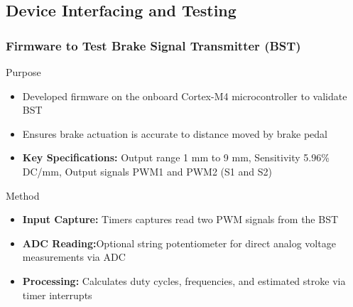 \documentclass[8pt,compress,aspectratio=169]{beamer}
\newcommand\LightBold[1]{\textcolor{VSBlueLight}{\textbf{#1}}}
\begin{document}
\subsection{Device Interfacing and Testing}
\begin{frame}
  \frametitle{Firmware to Test Brake Signal Transmitter (BST)}
  \begin{block}{Purpose}
    \small{
      \begin{itemize}
        \item Developed firmware on the onboard Cortex-M4 microcontroller to validate BST
        \item Ensures brake actuation is accurate to distance moved by brake pedal
        \item \LightBold{Key Specifications:} Output range 1 mm to 9 mm, Sensitivity 5.96\% DC/mm, Output signals PWM1 and PWM2 (S1 and S2)
      \end{itemize}
    }
  \end{block}
  \hspace{-0.5cm}
  \begin{minipage}{0.485\textwidth}
    \begin{block}{Method}
      \small{
        \begin{itemize}
          \item \LightBold{Input Capture:} Timers captures read two PWM signals from the BST
          \item \LightBold{ADC Reading:}Optional string potentiometer for direct analog voltage measurements via ADC 
          \item \LightBold{Processing:} Calculates duty cycles, frequencies, and estimated stroke via timer interrupts

\end{itemize}}
\end{block}
\end{minipage}
\end{frame}
\end{document}
